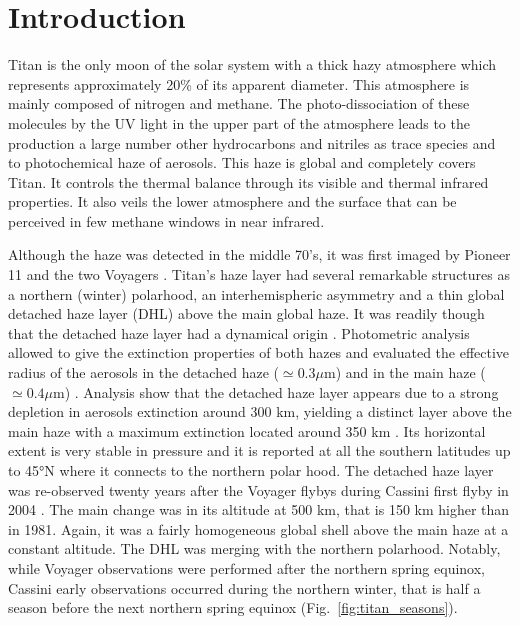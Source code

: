\section{Introduction}

Titan is the only moon of the solar system with a thick hazy atmosphere which represents approximately 20\% of its apparent
diameter. This atmosphere is mainly composed of nitrogen and methane. The photo-dissociation of these molecules by the
UV light in the upper part of the atmosphere leads to the production a large number other hydrocarbons and nitriles as
trace species and to photochemical haze of aerosols. This haze is global and completely covers Titan. It controls
the thermal balance through its visible and thermal infrared properties. It also veils the lower atmosphere and the
surface that can be perceived in few methane windows in near infrared.

Although the haze was detected in the middle 70's, it was first imaged by Pioneer 11 \citep{Smith1980} and the two Voyagers
\citep{Smith1981, Smith1982, Sromovsky1981}. Titan's haze layer had several remarkable structures as a northern (winter)
polarhood, an interhemispheric asymmetry and a thin global detached haze layer (DHL) above the main global haze. It was
readily though that the detached haze layer had a dynamical origin \citep{Smith1981}. Photometric analysis allowed
to give the extinction properties of both hazes and evaluated the effective radius of the aerosols in the detached
haze ($\simeq 0.3 \mu$m) and in the main haze ($\simeq 0.4 \mu$m) \citep{Rages1983, Rages1983a}. Analysis show
that the detached haze layer appears due to a strong depletion in aerosols extinction around 300 km, yielding a distinct
layer above the main haze with a maximum extinction located around 350 km \citep{Rages1983}. Its horizontal extent is
very stable in pressure and it is reported at all the southern latitudes up to \ang{45}N where it connects to the northern
polar hood. The detached haze layer was re-observed twenty years after the Voyager flybys during Cassini first flyby in 2004
\citep{Porco2005}. The main change was in its altitude at 500 km, that is 150 km higher than in 1981.
Again, it was a fairly homogeneous global shell above the main haze at a constant altitude.
The DHL was merging with the northern polarhood. Notably, while Voyager
observations were performed after the northern spring equinox, Cassini early observations occurred during the northern
winter, that is half a season before the next northern spring equinox (Fig.~\ref{fig:titan_seasons}).

